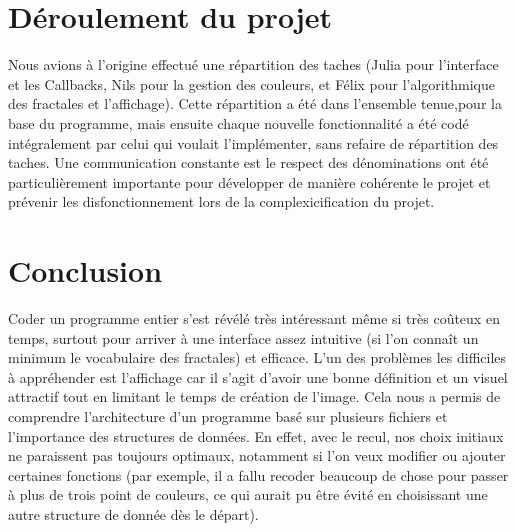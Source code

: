 \documentclass[a4paper,11pt]{article} \usepackage[T1]{fontenc} \usepackage[utf8]{inputenc} \usepackage[francais]{babel}
\begin{document}
\section{Déroulement du projet}
Nous avions à l'origine effectué une répartition des taches (Julia pour l'interface et les Callbacks, Nils pour la gestion des couleurs, et Félix pour l'algorithmique des fractales et l'affichage). Cette répartition a été dans l'ensemble tenue,pour la base du programme, mais ensuite chaque nouvelle fonctionnalité a été codé intégralement par celui qui voulait l'implémenter, sans refaire de répartition des taches. Une communication constante est le respect des dénominations ont été particulièrement importante pour développer de manière cohérente le projet et prévenir les disfonctionnement lors de la complexicification du projet.



\section{Conclusion}
Coder un programme entier s'est révélé très intéressant même si très coûteux en temps, surtout pour arriver à une interface assez intuitive (si l'on connaît un minimum le vocabulaire des fractales) et efficace. L'un des problèmes les difficiles à appréhender est l'affichage car il s'agit d'avoir une bonne définition et un visuel attractif tout en limitant le temps de création de l'image.
Cela nous a permis de comprendre l'architecture d'un programme basé sur plusieurs fichiers et l'importance des structures de données. En effet, avec le recul, nos choix initiaux ne paraissent pas toujours optimaux, notamment si l'on veux modifier ou ajouter certaines fonctions (par exemple, il a fallu recoder beaucoup de chose pour passer à plus de trois point de couleurs, ce qui aurait pu être évité en choisissant une autre structure de donnée dès le départ).
\end{document}
